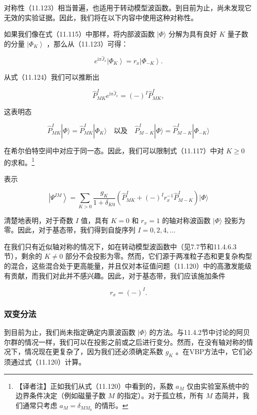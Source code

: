 对称性（11.123）相当普遍，也适用于转动模型波函数。到目前为止，尚未发现它无效的实验证据。因此，我们将在以下内容中使用这种对称性。

如果我们像在式（11.115）中那样，将内部波函数 $|\Phi\rangle$ 分解为具有良好 $K$ 量子数的分量 $\left|{\Phi}_{K}\right\rangle $
，那么从（11.123）可得：

\[
{e}^{{\mathrm{i}\pi}{\widehat{J}}_{x}}\left|{\Phi}_{K}\right\rangle ={r}_{x}\left|{\Phi}_{-K}\right\rangle .\tag{11.125}
\]

从式（11.124）我们可以推断出

\[
{\widehat{P}}^{I}_{MK}{e}^{{\mathrm{i}\pi}{\widehat{J}}_{x}}={\left(-\right)}^{I}{\widehat{P}}^{I}_{MK},\tag{11.126}
\]

这表明态

\[
\widehat{P}^{I}_{MK}|\Phi\rangle=\widehat{P}^{I}_{MK}|\Phi_{K}\rangle\quad\text{以及}\quad\widehat{P}^{I}_{M-K}|\Phi\rangle=\widehat{P}^{I}_{M-K}|\Phi_{-K}\rangle
\]

在希尔伯特空间中对应于同一态。因此，我们可以限制式（11.117）中对 $K\geq0$ 的求和。\footnote{【译者注】正如我们从式（11.120）中看到的，系数 $a_{M}$ 仅由实验室系统中的边界条件决定（例如磁量子数 $M$ 
的指定）。对于孤立核，所有 $M$ 
态简并，我们通常只考虑 $a_{M}=\delta_{MM_{0}}$ 的情形。}

表示

\[
\left|{\Psi}^{IM}\right\rangle =\mathop{\sum}\limits_{{K>0}}\frac{{g}_{K}}{1+{\delta}_{K0}}\left({{\widehat{P}}^{I}_{MK}+{\left(-\right)}^{I}{r}^{-1}_{x}{\widehat{P}}^{I}_{M-K}}\right)|\Phi\rangle\tag{11.127}
\]

清楚地表明，对于奇数 $I$ 值，具有 $K=0$ 和 ${r}_{x}=1$ 的轴对称波函数 $|\Phi\rangle$
投影为零。因此，对于基态带，我们得到自旋序列 $I=0,2,4,\ldots$

在我们只有近似轴对称的情况下，如在转动模型波函数中（见7.7节和11.4.6.3节），剩余的 $K\neq0$ 部分不会投影为零。然而，它们源于两准粒子态和更复杂构型的混合，这些混合处于更高能量，并且仅对本征值问题（11.120）中的高激发能级有贡献，而我们对此并不感兴趣。因此，对于基态带，我们应该施加条件

\[
{r}_{x}={\left(-\right)}^{I}.\tag{11.128}
\]


\subsubsection{双变分法\label{subsec:=0053CC=0053D8=005206=006CD5}}

到目前为止，我们尚未指定确定内禀波函数 $|\Phi\rangle$ 的方法。与11.4.2节中讨论的阿贝尔群的情况一样，我们可以在投影之前或之后进行变分。然而，在没有轴对称的情况下，情况现在更复杂了，因为我们还必须确定系数
${g}_{K}$ 。在VBP方法中，它们必须通过式（11.120）计算。

